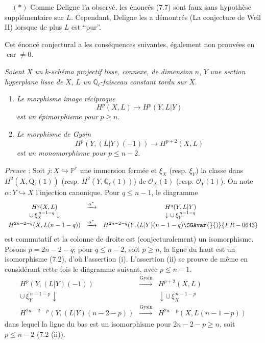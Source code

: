 \(\quad (*)\) Comme Deligne l'a observé, les énoncés (7.7) sont faux sans hypothèse supplémentaire sur $L$. Cependant, Deligne les a démontrés (La conjecture de Weil II) lorsque de plus $L$ est ``pur''.

Cet
énoncé conjectural a les conséquences suivantes, également non prouvées en $\operatorname{car}\ne0$.

\emph{Soient} $X$ \emph{un} $k$-\emph{schéma projectif lisse, connexe, de dimension} $n$, $Y$ \emph{une section hyperplane lisse de} $X$, $L$ \emph{un} $\mathbb{Q}_\ell$-\emph{faisceau constant tordu sur} $X$.
\begin{enumerate}[label=(\roman*)]
\item \emph{Le morphisme image réciproque}
\[
H^p(X,L)\to H^p(Y,L|Y)
\]
\emph{est un épimorphisme pour} $p\ge n$.
\item \emph{Le morphisme de Gysin}
\[
H^p(Y,(L|Y)(-1))\to H^{p+2}(X,L)
\]
\emph{est un monomorphisme pour} $p\le n-2$.
\end{enumerate}

\emph{Preuve} : Soit $j:X\hookrightarrow\mathbb{P}^r$ une immersion fermée et $\xi_X$ (resp. $\xi_Y$) la classe dans $H^2(X,\mathrm{Q}_\ell(1))$ (resp. $H^2(Y,\mathbb{Q}_\ell(1))$) de $\mathcal{O}_X(1)$ (resp. $\mathcal{O}_Y(1)$). On note $\alpha:Y\hookrightarrow X$ l'injection canonique. Pour $q\le n-1$, le diagramme
\[
\begin{array}{ccc}
H^q(X,L)&\xrightarrow{\alpha^*}&H^q(Y,L|Y)\\
\cup\,\xi_X^{\,n-1-q}\downarrow&&\downarrow\cup\,\xi_Y^{\,n-1-q}\\
H^{2n-2-q}(X,L(n-1-q))&\xrightarrow{\alpha^*}&
H^{2n-2-q}(Y,(L|Y)(n-1-q)\SGAvar{}{)}{FR-0643}
\end{array}
\]
est commutatif et la colonne de droite est (conjecturalement) un isomorphisme. Posons $p=2n-2-q$; pour $q\le n-2$, soit $p\ge n$, la ligne du haut est un isomorphisme (7.2), d'où l'assertion (i). L'assertion (ii) se prouve de même en considérant cette fois le diagramme suivant, avec $p\le n-1$.
\[
\begin{array}{ccc}
H^p(Y,(L|Y)(-1))&
\xrightarrow{\mathrm{Gysin}}&H^{p+2}(X,L)\\
\cup\,\xi_Y^{\,n-1-p}\downarrow&&\downarrow\cup\,\xi_X^{\,n-1-p}\\
H^{2n-2-p}(Y,(L|Y)(n-2-p))&\xrightarrow{\mathrm{Gysin}}&
H^{2n-p}(X,L(n-1-p))
\end{array}
\]
dans lequel la ligne du bas est un isomorphisme pour $2n-2-p\ge n$, soit $p\le n-2$ (7.2 (ii)).

